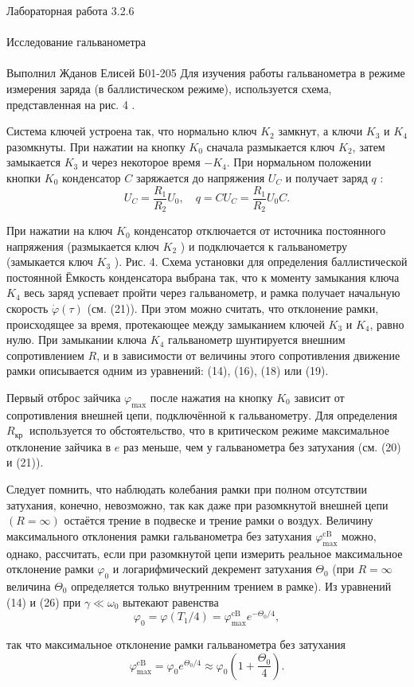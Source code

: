 \documentclass{astroedu-lab}
\begin{document}
\begin{problem}{\huge Лабораторная работа 3.2.6\\\\Исследование гальванометра\\\\Выполнил Жданов Елисей Б01-205}
Для изучения работы гальванометра в режиме измерения заряда (в баллистическом режиме), используется схема, представленная на рис. 4 .

Система ключей устроена так, что нормально ключ $K_2$ замкнут, а ключи $K_3$ и $K_4$ разомкнуты. При нажатии на кнопку $K_0$ сначала размыкается ключ $K_2$, затем замыкается $K_3$ и через некоторое время $-K_4$. При нормальном положении кнопки $K_0$ конденсатор $C$ заряжается до напряжения $U_C$ и получает заряд $q$ :
$$
U_C=\frac{R_1}{R_2} U_0, \quad q=C U_C=\frac{R_1}{R_2} U_0 C .
$$

При нажатии на ключ $K_0$ конденсатор отключается от источника постоянного напряжения (размыкается ключ $K_2$ ) и подключается к гальванометру (замыкается ключ $K_3$ ).
Рис. 4. Схема установки для определения баллистической постоянной
Ёмкость конденсатора выбрана так, что к моменту замыкания ключа $K_4$ весь заряд успевает пройти через гальванометр, и рамка получает начальную скорость $\dot{\varphi}(\tau)$ (см. (21)). При этом можно считать, что отклонение рамки, происходящее за время, протекающее между замыканием ключей $K_3$ и $K_4$, равно нулю. При замыкании ключа $K_4$ гальванометр шунтируется внешним сопротивлением $R$, и в зависимости от величины этого сопротивления движение рамки описывается одним из уравнений: (14), (16), (18) или (19).

Первый отброс зайчика $\varphi_{\max }$ после нажатия на кнопку $K_0$ зависит от сопротивления внешней цепи, подключённой к гальванометру. Для определения $R_{\text {кр }}$ используется то обстоятельство, что в критическом режиме максимальное отклонение зайчика в $e$ раз меньше, чем у гальванометра без затухания (см. (20) и (21)).

Следует помнить, что наблюдать колебания рамки при полном отсутствии затухания, конечно, невозможно, так как даже при разомкнутой внешней цепи $(R=\infty)$ остаётся трение в подвеске и трение рамки о воздух. Величину максимального отклонения рамки гальванометра без затухания $\varphi_{\max }^{\mathrm{cB}}$ можно, однако, рассчитать, если при разомкнутой цепи измерить реальное максимальное отклонение рамки $\varphi_0$ и логарифмический декремент затухания $\Theta_0$ (при $R=\infty$ величина $\Theta_0$ определяется только внутренним трением в рамке). Из уравнений (14) и (26) при $\gamma \ll \omega_0$ вытекают равенства
$$
\varphi_0=\varphi\left(T_1 / 4\right)=\varphi_{\max }^{\mathrm{cB}} e^{-\Theta_0 / 4},
$$

так что максимальное отклонение рамки гальванометра без затухания
$$
\varphi_{\max }^{\mathrm{cB}}=\varphi_0 e^{\Theta_0 / 4} \approx \varphi_0\left(1+\frac{\Theta_0}{4}\right) .
$$


\end{problem}
\end{document}
